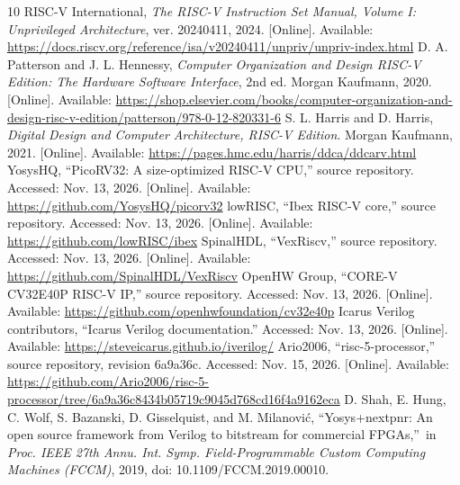 \begin{thebibliography}{10}
 RISC-V International, \emph{The RISC-V Instruction Set Manual, Volume I: Unprivileged Architecture}, ver. 20240411, 2024. [Online]. Available: \url{https://docs.riscv.org/reference/isa/v20240411/unpriv/unpriv-index.html}
 D. A. Patterson and J. L. Hennessy, \emph{Computer Organization and Design RISC-V Edition: The Hardware Software Interface}, 2nd ed. Morgan Kaufmann, 2020. [Online]. Available: \url{https://shop.elsevier.com/books/computer-organization-and-design-risc-v-edition/patterson/978-0-12-820331-6}
 S. L. Harris and D. Harris, \emph{Digital Design and Computer Architecture, RISC-V Edition}. Morgan Kaufmann, 2021. [Online]. Available: \url{https://pages.hmc.edu/harris/ddca/ddcarv.html}
 YosysHQ, ``PicoRV32: A size-optimized RISC-V CPU,'' source repository. Accessed: Nov. 13, 2026. [Online]. Available: \url{https://github.com/YosysHQ/picorv32}
 lowRISC, ``Ibex RISC-V core,'' source repository. Accessed: Nov. 13, 2026. [Online]. Available: \url{https://github.com/lowRISC/ibex}
 SpinalHDL, ``VexRiscv,'' source repository. Accessed: Nov. 13, 2026. [Online]. Available: \url{https://github.com/SpinalHDL/VexRiscv}
 OpenHW Group, ``CORE-V CV32E40P RISC-V IP,'' source repository. Accessed: Nov. 13, 2026. [Online]. Available: \url{https://github.com/openhwfoundation/cv32e40p}
 Icarus Verilog contributors, ``Icarus Verilog documentation.'' Accessed: Nov. 13, 2026. [Online]. Available: \url{https://steveicarus.github.io/iverilog/}
 Ario2006, ``risc-5-processor,'' source repository, revision 6a9a36c. Accessed: Nov. 15, 2026. [Online]. Available: \url{https://github.com/Ario2006/risc-5-processor/tree/6a9a36c8434b05719c9045d768cd16f4a9162eca}
\ifdefined\phaseTwoReport
{} D. Shah, E. Hung, C. Wolf, S. Bazanski, D. Gisselquist, and M. Milanovi\'{c}, \textquotedblleft Yosys+nextpnr: An open source framework from Verilog to bitstream for commercial FPGAs,\textquotedblright\ in \emph{Proc. IEEE 27th Annu. Int. Symp. Field-Programmable Custom Computing Machines (FCCM)}, 2019, doi: 10.1109/FCCM.2019.00010.
\fi
\end{thebibliography}
